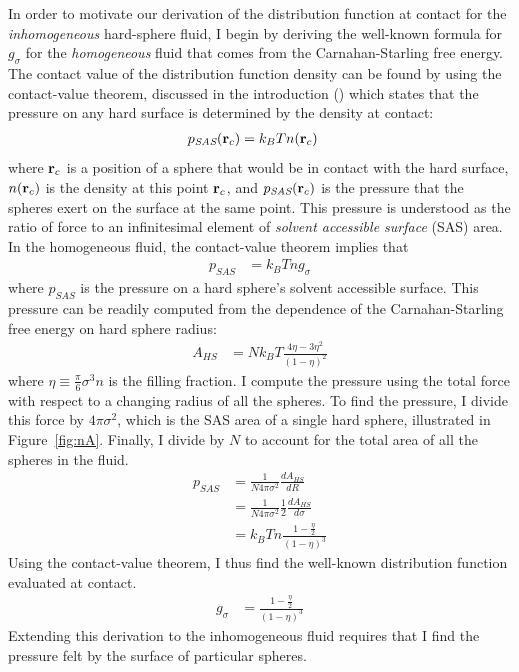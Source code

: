 In order to motivate our derivation of the distribution function at
contact for the \emph{inhomogeneous} hard-sphere fluid, I begin by
deriving the well-known formula for $g_\sigma$ for the
\emph{homogeneous} fluid that comes from the Carnahan-Starling free
energy.  The contact value of the distribution function density can be
found by using the contact-value theorem, discussed in the
introduction () which states
that the pressure on any hard surface is determined by the density at
contact:
\begin{align}
  p_{\textit{SAS}}(\textbf{r}_c) &= k_BT n(\textbf{r}_c)
\end{align}
where $\textbf{r}_c$ is a position of a sphere that would be in contact with
the hard surface, $n(\textbf{r}_c)$ is the density at this point $\textbf{r}_c$, and
$p_{\textit{SAS}}(\textbf{r}_c)$ is the pressure that the spheres
exert on the surface at the same point.  This pressure is
understood as the ratio of force to an infinitesimal element of
\emph{solvent accessible surface} (SAS) area.
%
In the homogeneous fluid, the contact-value theorem implies that
\begin{align}
  p_{\textit{SAS}} &= k_BT n g_\sigma
\end{align}
where $p_{SAS}$ is the pressure on a hard sphere's solvent accessible surface.
This pressure can be
readily computed from the dependence of the Carnahan-Starling free
energy on hard sphere radius:
\begin{align}
  A_{HS} &= Nk_BT \frac{4\eta - 3\eta^2}{(1-\eta)^2}
\end{align}
where $\eta \equiv \frac{\pi}{6} \sigma^3 n$ is the filling fraction.
I compute the pressure using the total force with
respect to a changing radius of all the spheres.
To find the pressure, I divide this force by $4\pi \sigma^2$, which
is the SAS area of a single hard sphere, illustrated in Figure~\ref{fig:nA}.
Finally, I divide by $N$ to account for the total area of all the
spheres in the fluid.
\begin{align}
  p_{\textit{SAS}} &= \frac{1}{N 4\pi \sigma^2} \frac{dA_{HS}}{dR} \\
  &= \frac{1}{N 4\pi \sigma^2} \frac12 \frac{dA_{HS}}{d\sigma} \\
  &= k_BT n \frac{1 - \frac{\eta}2}{(1-\eta)^3}
\end{align}
Using the contact-value theorem, I thus find the well-known
distribution function evaluated at contact.
\begin{align}
  g_\sigma &= \frac{1 - \frac{\eta}2}{(1-\eta)^3} \label{eq:cs-g}
\end{align}
Extending this derivation to the inhomogeneous fluid requires that I
find the pressure felt by the surface of particular spheres.


